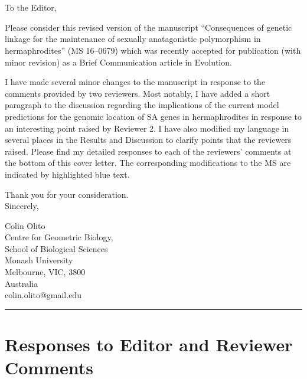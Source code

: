 \documentclass[11pt]{article}
\begin{document}




\section*{}
\noindent To the Editor,
\bigskip

Please consider this revised version of the manuscript “Consequences of genetic linkage for the maintenance of sexually anatagonistic polymorphism in hermaphrodites” (MS 16--0679) which was recently accepted for publication (with minor revision) as a Brief Communication article in Evolution.
\bigskip

I have made several minor changes to the manuscript in response to the comments provided by two reviewers. Most notably, I have added a short paragraph to the discussion regarding the implications of the current model predictions for the genomic location of SA genes in hermaphrodites in response to an interesting point raised by Reviewer 2. I have also modified my language in several places in the Results and Discussion to clarify points that the reviewers raised. Please find my detailed responses to each of the reviewers' comments at the bottom of this cover letter. The corresponding modifications to the MS are indicated by highlighted blue text.
\bigskip

\noindent Thank you for your consideration. \\
\noindent Sincerely,
\bigskip

\noindent Colin Olito \\
\noindent Centre for Geometric Biology, \\
\noindent School of Biological Sciences \\
\noindent Monash University \\
\noindent Melbourne, VIC, 3800 \\
\noindent Australia \\
\noindent colin.olito@gmail.edu \\
	
\bigskip
\noindent \rule{\textwidth}{0.4pt}
\bigskip

\newpage{}

\section*{Responses to Editor and Reviewer Comments}
\end{document}
